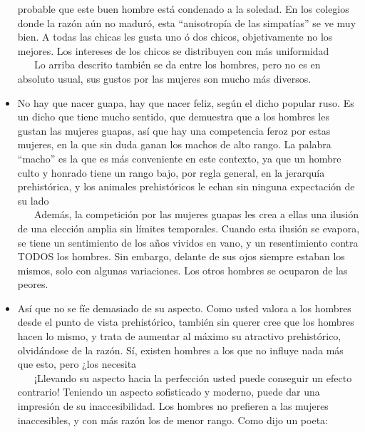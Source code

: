 \begin{itemize}
  probable que este buen hombre está condenado a la soledad. En los
  colegios donde la razón aún no maduró, esta ``anisotropía de las
  simpatías'' se ve muy bien. A todas las chicas les gusta uno ó dos
  chicos, objetivamente no los mejores. Los intereses de los chicos se
  distribuyen con más uniformidad\\
  \hspace*{0.333em} ~ ~ Lo arriba descrito también se da entre los
  hombres, pero no es en absoluto usual, sus gustos por las mujeres son
  mucho más diversos.
\item
  No hay que nacer guapa, hay que nacer feliz, según el dicho popular
  ruso. Es un dicho que tiene mucho sentido, que demuestra que a los
  hombres les gustan las mujeres guapas, así que hay una competencia
  feroz por estas mujeres, en la que sin duda ganan los machos de alto
  rango. La palabra ``macho'' es la que es más conveniente en este
  contexto, ya que un hombre culto y honrado tiene un rango bajo, por
  regla general, en la jerarquía prehistórica, y los animales
  prehistóricos le echan sin ninguna expectación de su lado\\
  \hspace*{0.333em} ~ ~ Además, la competición por las mujeres guapas
  les crea a ellas una ilusión de una elección amplia sin límites
  temporales. Cuando esta ilusión se evapora, se tiene un sentimiento de
  los años vividos en vano, y un resentimiento contra TODOS los hombres.
  Sin embargo, delante de sus ojos siempre estaban los mismos, solo con
  algunas variaciones. Los otros hombres se ocuparon de las peores.
\item
  Así que no se fíe demasiado de su aspecto. Como usted valora a los
  hombres desde el punto de vista prehistórico, también sin querer cree
  que los hombres hacen lo mismo, y trata de aumentar al máximo su
  atractivo prehistórico, olvidándose de la razón. Sí, existen hombres a
  los que no influye nada más que esto, pero ¿los necesita\\
  \hspace*{0.333em} ~ ~ ¡Llevando su aspecto hacia la perfección usted
  puede conseguir un efecto contrario! Teniendo un aspecto sofisticado y
  moderno, puede dar una impresión de su inaccesibilidad. Los hombres no
  prefieren a las mujeres inaccesibles, y con más razón los de menor
  rango. Como dijo un poeta:


\end{itemize}

